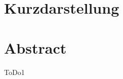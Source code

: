 \thispagestyle{empty}
\section*{Kurzdarstellung}
\label{sec:kurzdarstellung}

\blindtext


\section*{Abstract}
\label{sec:abstract}

ToDo1
